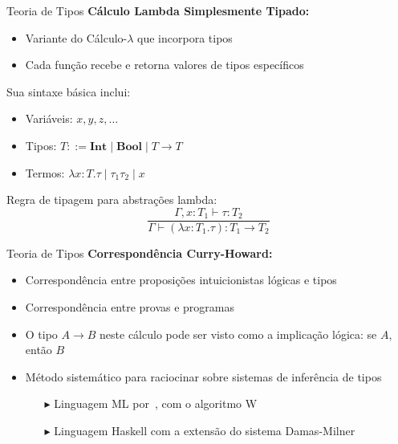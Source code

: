 
\begin{frame}{Teoria de Tipos}
    \textbf{Cálculo Lambda Simplesmente Tipado:}\\
    \begin{itemize}
        \item Variante do Cálculo-$\lambda$ que incorpora tipos~\cite{CHURCH1940}
        \item Cada função recebe e retorna valores de tipos específicos
    \end{itemize}
    Sua sintaxe básica inclui:

    \begin{itemize}
        \item Variáveis: $x, y, z, \ldots$
        \item Tipos: $T ::= \textbf{Int} \mid \textbf{Bool} \mid T \to T$
        \item Termos: $\lambda x:T. \tau \mid \tau_1 \tau_2 \mid x$
        \item[]
    \end{itemize}

    Regra de tipagem para abstrações lambda:
    \[
        \frac{\Gamma, x:T_1 \vdash \tau:T_2}{\Gamma \vdash (\lambda x:T_1. \tau): T_1 \to T_2}\nonumber
    \]
\end{frame}


\begin{frame}{Teoria de Tipos}
    \textbf{Correspondência Curry-Howard:}
    \begin{itemize}
        \item Correspondência entre proposições intuicionistas lógicas e tipos
        \item Correspondência entre provas e programas
        \item O tipo $A \to B$ neste cálculo pode ser visto como a implicação lógica: se $A$, então $B$
        \item Método sistemático para raciocinar sobre sistemas de inferência de tipos
              \begin{itemize}
                  \item[$\blacktriangleright$] Linguagem ML por~, com o algoritmo W
                  \item[$\blacktriangleright$] Linguagem Haskell com a extensão do sistema Damas-Milner
              \end{itemize}
    \end{itemize}
\end{frame}

